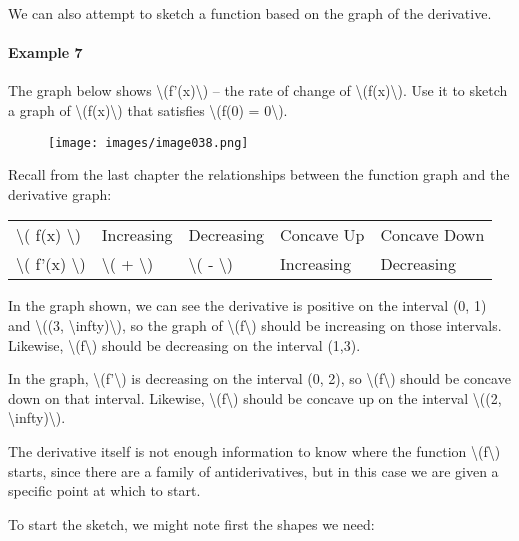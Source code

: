 We can also attempt to sketch a function based on the graph of the
derivative.

\hypertarget{example-7}{%
\paragraph{Example 7}\label{example-7}}

The graph below shows \textbackslash{}(f'(x)\textbackslash{}) -- the
rate of change of \textbackslash{}(f(x)\textbackslash{}). Use it to
sketch a graph of \textbackslash{}(f(x)\textbackslash{}) that satisfies
\textbackslash{}(f(0) = 0\textbackslash{}).

\begin{figure}
\centering
\texttt{[image: images/image038.png]}
\caption{}
\end{figure}

Recall from the last chapter the relationships between the function
graph and the derivative graph:

\begin{longtable}[]{@{}lllll@{}}
\toprule
\endhead
\textbackslash{}( f(x) \textbackslash{}) & Increasing & Decreasing &
Concave Up & Concave Down\tabularnewline
\textbackslash{}( f'(x) \textbackslash{}) & \textbackslash{}( +
\textbackslash{}) & \textbackslash{}( - \textbackslash{}) & Increasing &
Decreasing\tabularnewline
\bottomrule
\end{longtable}

In the graph shown, we can see the derivative is positive on the
interval (0, 1) and \textbackslash{}((3,
\textbackslash{}infty)\textbackslash{}), so the graph of
\textbackslash{}(f\textbackslash{}) should be increasing on those
intervals. Likewise, \textbackslash{}(f\textbackslash{}) should be
decreasing on the interval (1,3).

In the graph, \textbackslash{}(f'\textbackslash{}) is decreasing on the
interval (0, 2), so \textbackslash{}(f\textbackslash{}) should be
concave down on that interval. Likewise,
\textbackslash{}(f\textbackslash{}) should be concave up on the interval
\textbackslash{}((2, \textbackslash{}infty)\textbackslash{}).

The derivative itself is not enough information to know where the
function \textbackslash{}(f\textbackslash{}) starts, since there are a
family of antiderivatives, but in this case we are given a specific
point at which to start.

To start the sketch, we might note first the shapes we need:

